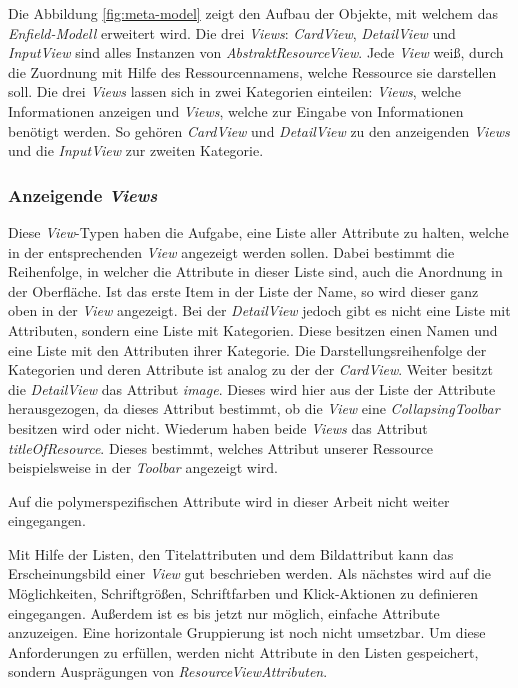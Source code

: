Die Abbildung \ref{fig:meta-model} zeigt den Aufbau der Objekte, mit welchem das \textit{Enfield-Modell} erweitert wird. Die drei \textit{Views}: \textit{CardView}, \textit{DetailView} und \textit{InputView} sind alles Instanzen von \textit{AbstraktResourceView}. Jede \textit{View} weiß, durch die Zuordnung mit Hilfe des Ressourcennamens, welche Ressource sie darstellen soll. Die drei \textit{Views} lassen sich in zwei Kategorien einteilen: \textit{Views}, welche Informationen anzeigen und \textit{Views}, welche zur Eingabe von Informationen benötigt werden.
So gehören \textit{CardView} und \textit{DetailView} zu den anzeigenden \textit{Views} und die \textit{InputView} zur zweiten Kategorie. 

\subsubsection{Anzeigende \textit{Views}}
Diese \textit{View}-Typen haben die Aufgabe, eine Liste aller Attribute zu halten, welche in der entsprechenden \textit{View} angezeigt werden sollen. Dabei bestimmt die Reihenfolge, in welcher die Attribute in dieser Liste sind, auch die Anordnung in der Oberfläche. Ist das erste Item in der Liste der Name, so wird dieser ganz oben in der \textit{View} angezeigt.
Bei der \textit{DetailView} jedoch gibt es nicht eine Liste mit Attributen, sondern eine Liste mit Kategorien. Diese besitzen 
einen Namen und eine Liste mit den Attributen ihrer Kategorie. Die Darstellungsreihenfolge der Kategorien und deren Attribute ist analog zu der der \textit{CardView}. Weiter besitzt die \textit{DetailView} das Attribut \textit{image}. Dieses wird hier aus der Liste der Attribute herausgezogen, da dieses Attribut bestimmt, ob die \textit{View} eine \textit{CollapsingToolbar} besitzen wird oder nicht. Wiederum haben beide \textit{Views} das Attribut \textit{titleOfResource}. Dieses bestimmt, welches Attribut unserer Ressource beispielsweise in der \textit{Toolbar} angezeigt wird.

Auf die polymerspezifischen Attribute wird in dieser Arbeit nicht weiter eingegangen.

Mit Hilfe der Listen, den Titelattributen und dem Bildattribut kann das Erscheinungsbild einer \textit{View} gut beschrieben werden. Als nächstes wird auf die Möglichkeiten, Schriftgrößen, Schriftfarben und Klick-Aktionen zu definieren eingegangen.
Außerdem ist es bis jetzt nur möglich, einfache Attribute anzuzeigen. Eine horizontale Gruppierung ist noch nicht umsetzbar. Um diese Anforderungen zu erfüllen, werden nicht Attribute in den Listen gespeichert, sondern Ausprägungen von \textit{ResourceViewAttributen}. 


